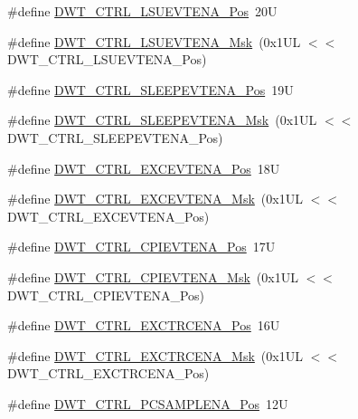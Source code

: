 \begin{DoxyCompactItemize}
\item 
\#define \hyperlink{group___c_m_s_i_s___d_w_t_gaea5d1ee72188dc1d57b54c60a9f5233e}{D\+W\+T\+\_\+\+C\+T\+R\+L\+\_\+\+L\+S\+U\+E\+V\+T\+E\+N\+A\+\_\+\+Pos}~20U
\item 
\#define \hyperlink{group___c_m_s_i_s___d_w_t_gac47427f455fbc29d4b6f8a479169f2b2}{D\+W\+T\+\_\+\+C\+T\+R\+L\+\_\+\+L\+S\+U\+E\+V\+T\+E\+N\+A\+\_\+\+Msk}~(0x1\+U\+L $<$$<$ D\+W\+T\+\_\+\+C\+T\+R\+L\+\_\+\+L\+S\+U\+E\+V\+T\+E\+N\+A\+\_\+\+Pos)
\item 
\#define \hyperlink{group___c_m_s_i_s___d_w_t_ga9c6d62d121164013a8e3ee372f17f3e5}{D\+W\+T\+\_\+\+C\+T\+R\+L\+\_\+\+S\+L\+E\+E\+P\+E\+V\+T\+E\+N\+A\+\_\+\+Pos}~19U
\item 
\#define \hyperlink{group___c_m_s_i_s___d_w_t_ga2f431b3734fb840daf5b361034856da9}{D\+W\+T\+\_\+\+C\+T\+R\+L\+\_\+\+S\+L\+E\+E\+P\+E\+V\+T\+E\+N\+A\+\_\+\+Msk}~(0x1\+U\+L $<$$<$ D\+W\+T\+\_\+\+C\+T\+R\+L\+\_\+\+S\+L\+E\+E\+P\+E\+V\+T\+E\+N\+A\+\_\+\+Pos)
\item 
\#define \hyperlink{group___c_m_s_i_s___d_w_t_gaf4e73f548ae3e945ef8b1d9ff1281544}{D\+W\+T\+\_\+\+C\+T\+R\+L\+\_\+\+E\+X\+C\+E\+V\+T\+E\+N\+A\+\_\+\+Pos}~18U
\item 
\#define \hyperlink{group___c_m_s_i_s___d_w_t_gab7ee0def33423b5859ca4030dff63b58}{D\+W\+T\+\_\+\+C\+T\+R\+L\+\_\+\+E\+X\+C\+E\+V\+T\+E\+N\+A\+\_\+\+Msk}~(0x1\+U\+L $<$$<$ D\+W\+T\+\_\+\+C\+T\+R\+L\+\_\+\+E\+X\+C\+E\+V\+T\+E\+N\+A\+\_\+\+Pos)
\item 
\#define \hyperlink{group___c_m_s_i_s___d_w_t_ga9fff0b71fb0be1499f5180c6bce1fc8f}{D\+W\+T\+\_\+\+C\+T\+R\+L\+\_\+\+C\+P\+I\+E\+V\+T\+E\+N\+A\+\_\+\+Pos}~17U
\item 
\#define \hyperlink{group___c_m_s_i_s___d_w_t_ga189089c30aade60b983df17ad2412f6f}{D\+W\+T\+\_\+\+C\+T\+R\+L\+\_\+\+C\+P\+I\+E\+V\+T\+E\+N\+A\+\_\+\+Msk}~(0x1\+U\+L $<$$<$ D\+W\+T\+\_\+\+C\+T\+R\+L\+\_\+\+C\+P\+I\+E\+V\+T\+E\+N\+A\+\_\+\+Pos)
\item 
\#define \hyperlink{group___c_m_s_i_s___d_w_t_ga05f13b547a9a1e63e003ee0bc6446d0d}{D\+W\+T\+\_\+\+C\+T\+R\+L\+\_\+\+E\+X\+C\+T\+R\+C\+E\+N\+A\+\_\+\+Pos}~16U
\item 
\#define \hyperlink{group___c_m_s_i_s___d_w_t_gaf4fbb509ab3cbb768f16484c660a24c3}{D\+W\+T\+\_\+\+C\+T\+R\+L\+\_\+\+E\+X\+C\+T\+R\+C\+E\+N\+A\+\_\+\+Msk}~(0x1\+U\+L $<$$<$ D\+W\+T\+\_\+\+C\+T\+R\+L\+\_\+\+E\+X\+C\+T\+R\+C\+E\+N\+A\+\_\+\+Pos)
\item 
\#define \hyperlink{group___c_m_s_i_s___d_w_t_ga1e14afc7790fcb424fcf619e192554c9}{D\+W\+T\+\_\+\+C\+T\+R\+L\+\_\+\+P\+C\+S\+A\+M\+P\+L\+E\+N\+A\+\_\+\+Pos}~12U
$$
\end{DoxyCompactItemize}
